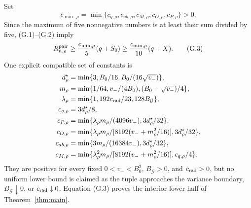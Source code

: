 Set
\[
 c_{\min,\rho}=\min\{c_{q,\rho},c_{ab,\rho},
 c_{M,\rho},c_{O,\rho},c_{P,\rho}\}>0.
\]
Since the maximum of five nonnegative numbers is at least their sum divided
by five, (G.1)--(G.2) imply
\[
 R^{\mathrm{pair}}_{n,\rho}\ge\frac{c_{\min,\rho}}5(q+S_0)
 \ge\frac{c_{\min,\rho}}{10}(q+X).
 \tag{G.3}
\]
One explicit compatible set of constants is
\begin{align*}
 d_\rho^\star&=\min\{3,B_0/16,B_0/(16\sqrt{v_-})\},\\
 m_\rho&=\min\{1/64,v_-/(4B_0),(B_0-\sqrt{v_-})/4\},\\
 \lambda_\rho&=\min\{1,192c_{\rm rad}/23,128B_{\mathcal G}\},\\
 c_{q,\rho}&=3d_\rho^\star/8,\\
 c_{P,\rho}&=\min\{\lambda_\rho m_\rho/(4096v_-),
                         3d_\rho^\star/32\},\\
 c_{O,\rho}&=\min\{\lambda_\rho m_\rho/
 [8192(v_-+m_\rho^2/16)],3d_\rho^\star/32\},\\
 c_{ab,\rho}&=\min\{3m_\rho/(16384v_-),
                          3d_\rho^\star/32\},\\
 c_{M,\rho}&=\min\{\lambda_\rho^2m_\rho/
 [8192(v_-+m_\rho^2/16)],c_{q,\rho}/4\}.
\end{align*}
They are positive for every fixed \(0<v_-<B_0^2\),
\(B_{\mathcal G}>0\), and \(c_{\rm rad}>0\), but no uniform lower bound
is claimed as the tuple approaches the variance boundary,
\(B_{\mathcal G}\downarrow0\), or \(c_{\rm rad}\downarrow0\).
Equation (G.3) proves the interior lower half of
Theorem~\ref{thm:main}.
